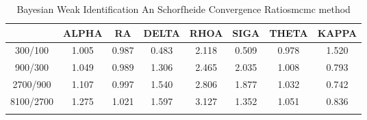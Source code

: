 \documentclass[a4paper,10pt]{article}
\begin{document}
\centering
\begin{longtable}{cccccccc}
\toprule
 & ALPHA & RA & DELTA & RHOA & SIGA & THETA & KAPPA \\
\midrule
300/100 & 1.005 & 0.987 & 0.483 & 2.118 & 0.509 & 0.978 & 1.520 \\
900/300 & 1.049 & 0.989 & 1.306 & 2.465 & 2.035 & 1.008 & 0.793 \\
2700/900 & 1.107 & 0.997 & 1.540 & 2.806 & 1.877 & 1.032 & 0.742 \\
8100/2700 & 1.275 & 1.021 & 1.597 & 3.127 & 1.352 & 1.051 & 0.836 \\
\bottomrule
\caption{Bayesian Weak Identification An Schorfheide Convergence Ratiosmcmc method}
\label{table:tbl:WeakAnSchoConvergenceRatios_mcmc}
\end{longtable}
\end{document}
